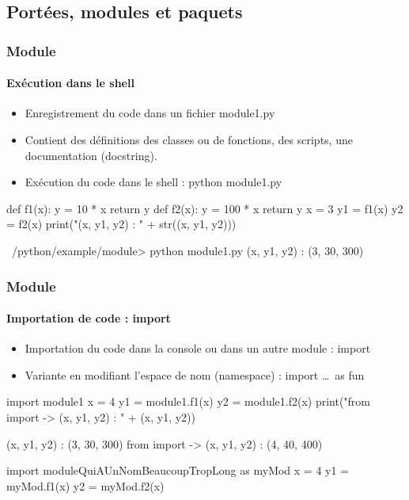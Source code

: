 \subsection{Portées, modules et paquets}
\begin{frame}[fragile]
\frametitle{Module}
\framesubtitle{Exécution dans le shell}
\begin{itemize}
\item Enregistrement du code dans un fichier module1.py
\item Contient des définitions des classes ou de fonctions, des scripts, une documentation (docstring).  
\item Exécution du code dans le shell : python module1.py
\end{itemize}
\begin{python}
def f1(x):
    y = 10 * x
    return y
def f2(x):
    y = 100 * x
    return y
x = 3
y1 = f1(x)
y2 = f2(x)
print("(x, y1, y2) : " + str((x, y1, y2)))
\end{python}

\begin{shell}
~/python/example/module> python module1.py
(x, y1, y2) : (3, 30, 300)
\end{shell}
\end{frame}
\begin{frame}[fragile]
\frametitle{Module}
\framesubtitle{Importation de code : import}
\begin{itemize}
\item Importation du code dans la console ou dans un autre module : import  
\item Variante en modifiant l'espace de nom (namespace) : import \dots\ as fun
\end{itemize}
\begin{python}
import module1
x = 4
y1 = module1.f1(x)
y2 = module1.f2(x)
print("from import -> (x, y1, y2) : " + (x, y1, y2))
\end{python}

\begin{shell}
(x, y1, y2) : (3, 30, 300)
from import -> (x, y1, y2) : (4, 40, 400)
\end{shell}

\begin{python}
import moduleQuiAUnNomBeaucoupTropLong as myMod
x = 4
y1 = myMod.f1(x)
y2 = myMod.f2(x)
\end{python}
\end{frame}
